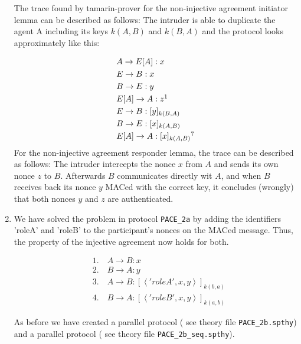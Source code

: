 \documentclass[a4paper,11pt]{scrartcl}
\newcommand{\tuple}[1]{\left\langle #1\right\rangle}
\begin{document}
\begin{enumerate}[label=\alph*)]
The trace found by tamarin-prover for the non-injective agreement initiator lemma can be described as follows: The intruder is able to duplicate the agent A including its keys $k(A,B)$ and $k(B,A)$ and the protocol looks approximately like this:

\begin{align*}
&A \rightarrow E[A]: x\\
&E \rightarrow B: x\\
&B \rightarrow E: y\\
&E[A] \rightarrow A: z \footnotemark\\
&E \rightarrow B: [y]_{k(B,A)}\\
&B \rightarrow E: [x]_{k(A,B)}\\
&E[A]\rightarrow A: [x]_{k(A,B)} \footnotemark[7]
\end{align*}
 \newline
For the non-injective agreement responder lemma, the trace can be described as follows: The intruder intercepts the nonce $x$ from $A$ and sends its own nonce $z$ to $B$. Afterwards $B$ communicates directly wit $A$, and when $B$ receives back its nonce $y$ MACed with the correct key, it concludes (wrongly) that both nonces $y$ and $z$ are authenticated.
\newpage
\item We have solved the problem in protocol  \texttt{PACE_2a} by adding the identifiers 'roleA' and 'roleB' to the participant's nonces on the MACed message.  Thus, the property of the injective agreement now holds for both.

\begin{align*}
&\text{1.} \quad A \rightarrow B: x\\
&\text{2.} \quad B \rightarrow A: y\\
&\text{3.} \quad A \rightarrow B: [\tuple{'roleA', x, y}]_{k(b,a)}\\
&\text{4.} \quad B \rightarrow A: [\tuple{'roleB', x, y}]_{k(a,b)}
\end{align*}

As before we have created a parallel protocol ( see theory file \texttt{PACE\_2b.spthy}) and a parallel protocol ( see theory file \texttt{PACE\_2b\_seq.spthy}).
\end{enumerate}
\end{document}
